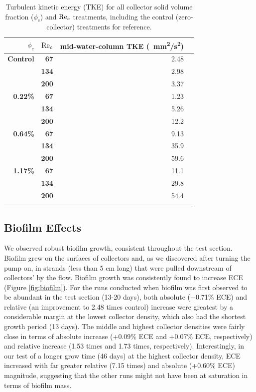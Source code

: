 \documentclass[geosciences,article,submit,moreauthors,pdftex]{Definitions/mdpi}
\begin{document}
\begin{table}[h]
\caption{Turbulent kinetic energy (TKE) for all collector solid volume fraction ($\phi_c$) and $\mathrm{Re}_c$ treatments, including the control (zero-collector) treatments for reference.}
\centering
\begin{tabular}{>{\bfseries}r>{\bfseries}rrr}
\toprule
\textbf{$\phi_c$}&\textbf{$\mathrm{Re}_c$}&\textbf{mid-water-column TKE (\SI{}{\milli\metre^2/\second^2})}\\
\midrule
Control &   67  & \num{2.48}\\
        &   134 & \num{2.98}\\
        &   200 & \num{3.37}\\
\midrule
0.22\% &   67  & \num{1.23}\\
        &   134 & \num{5.26}\\
        &   200 & \num{12.2}\\
\midrule
0.64\% &   67  & \num{9.13}\\
        &   134 & \num{35.9}\\
        &   200 & \num{59.6}\\
\midrule
1.17\%  &   67  & \num{11.1}\\
        &   134 & \num{29.8}\\
        &   200 & \num{54.4}\\
\bottomrule
\label{tbl:turbulence}
\end{tabular}
\end{table}

\subsection{Biofilm Effects}

We observed robust biofilm growth, consistent throughout the test section. Biofilm grew on the surfaces of collectors and, as we discovered after turning the pump on, in strands (less than 5 cm long) that were pulled downstream of collectors' by the flow. Biofilm growth was consistently found to increase ECE (Figure \ref{fig:biofilm}). For the runs conducted when biofilm was first observed to be abundant in the test section (13-20 days), both absolute (+0.71\% ECE) and relative (an improvement to 2.48 times control) increase were greatest by a considerable margin at the lowest collector density, which also had the shortest growth period (13 days). The middle and highest collector densities were fairly close in terms of absolute increase (+0.09\% ECE and +0.07\% ECE, respectively) and relative increase (1.53 times and 1.73 times, respectively). Interestingly, in our test of a longer grow time (46 days) at the highest collector density, ECE increased with far greater relative (7.15 times) and absolute (+0.60\% ECE) magnitude, suggesting that the other runs might not have been at saturation in terms of biofilm mass.
\end{document}
